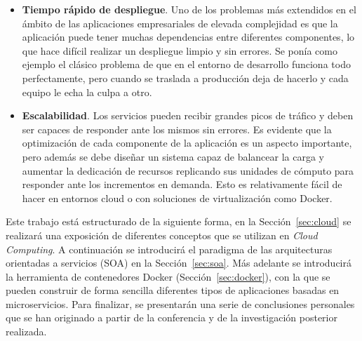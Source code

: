 \begin{itemize}
\begin{figure}
\caption{\label{fig:zerodt}Esquema de recuperación ante fallos.}
\end{figure}
Cómo se puede observar en la Figura~\ref{fig:zerodt}, cuando el servidor físico A falla, se desencadena una migración del contenedor virtual al servidor B. Lo que debería ocurrir sin complicaciones en caso de que el volumen de datos compartido por red siga disponible y solo haya ocurrido un problema aislado en la máquina A. En general, el demonio encargado de vigilar el correcto funcionamiento de los nodos se denomina \textit{watchdog} y su funcionamiento se basa en el intercambio periódico de mensajes con los nodos del cluster para intercambiar información del estado del servicio (\textit{keepalive o hearbeat}).
\item \textbf{Tiempo rápido de despliegue}. Uno de los problemas más extendidos en el ámbito de las aplicaciones empresariales de elevada complejidad es que la aplicación puede tener muchas dependencias entre diferentes componentes, lo que hace difícil realizar un despliegue limpio y sin errores. Se ponía como ejemplo el clásico problema de que en el entorno de desarrollo funciona todo perfectamente, pero cuando se traslada a producción deja de hacerlo y cada equipo le echa la culpa a otro.
\item \textbf{Escalabilidad}. Los servicios pueden recibir grandes picos de tráfico y deben ser capaces de responder ante los mismos sin errores. Es evidente que la optimización de cada componente de la aplicación es un aspecto importante, pero además se debe diseñar un sistema capaz de balancear la carga y aumentar la dedicación de recursos replicando sus unidades de cómputo para responder ante los incrementos en demanda. Esto es relativamente fácil de hacer en entornos cloud o con soluciones de virtualización como Docker.
\end{itemize}

Este trabajo está estructurado de la siguiente forma, en la Sección~\ref{sec:cloud} se realizará una exposición de diferentes conceptos que se utilizan en \emph{Cloud Computing}. A continuación se introducirá el paradigma de las arquitecturas orientadas a servicios (SOA) en la Sección~\ref{sec:soa}. Más adelante se introducirá la herramienta de contenedores Docker (Sección~\ref{sec:docker}), con la que se pueden construir de forma sencilla diferentes tipos de aplicaciones basadas en microservicios. Para finalizar, se presentarán una serie de conclusiones personales que se han originado a partir de la conferencia y de la investigación posterior realizada.

